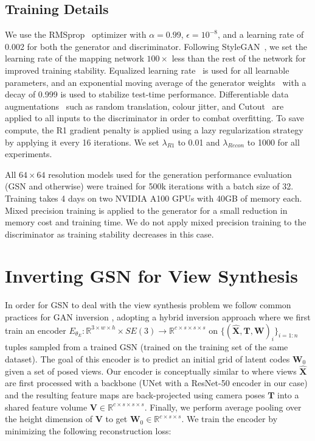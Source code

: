 \documentclass[10pt,twocolumn,letterpaper]{article}
\begin{document}
\subsection{Training Details} We use the RMSprop~\cite{rmsprop} optimizer with $\alpha=0.99$, $\epsilon=10^{-8}$, and a learning rate of 0.002 for both the generator and discriminator. Following StyleGAN~\cite{stylegan}, we set the learning rate of the mapping network $100\times$ less than the rest of the network for improved training stability. Equalized learning rate~\cite{progan} is used for all learnable parameters, and an exponential moving average of the generator weights~\cite{progan} with a decay of 0.999 is used to stabilize test-time performance. Differentiable data augmentations~\cite{diffaugment} such as random translation, colour jitter, and Cutout~\cite{cutout} are applied to all inputs to the discriminator in order to combat overfitting. To save compute, the R1 gradient penalty is applied using a lazy regularization strategy~\cite{stylegan2} by applying it every 16 iterations. We set $\lambda_{R1}$ to 0.01 and $\lambda_{Recon}$ to 1000 for all experiments.

All $64\times64$ resolution models used for the generation performance evaluation (GSN and otherwise) were trained for 500k iterations with a batch size of 32. Training takes 4 days on two NVIDIA A100 GPUs with 40GB of memory each. Mixed precision training is applied to the generator for a small reduction in memory cost and training time. We do not apply mixed precision training to the discriminator as training stability decreases in this case.


\section{Inverting GSN for View Synthesis}

In order for GSN to deal with the view synthesis problem we follow common practices for GAN inversion \cite{ganinversion}, adopting a hybrid inversion approach where we first train an encoder $E_{\theta_E}: \mathbb{R}^{3 \times w \times h}\times SE(3) \longrightarrow \mathbb{R}^{c \times s \times s \times s}$ on $\{(\hat{\textbf{X}}, \textbf{T}, \textbf{W})_i\}_{i=1:n}$ tuples sampled from a trained GSN (trained on the training set of the same dataset). The goal of this encoder is to predict an initial grid of latent codes $\textbf{W}_0$ given a set of posed views. Our encoder is conceptually similar to \cite{mvsmachine,atlas} where views $\hat{\textbf{X}}$ are first processed with a backbone (UNet \cite{unet} with a ResNet-50 encoder in our case) and the resulting feature maps are back-projected using camera poses $\textbf{T}$ into a shared feature volume $\textbf{V} \in \mathbb{R}^{c \times s \times s \times s}$. Finally, we perform average pooling over the height dimension of $\textbf{V}$ to get $\textbf{W}_0 \in \mathbb{R}^{c \times s \times s}$. We train the encoder by minimizing the following reconstruction loss:
\end{document}
